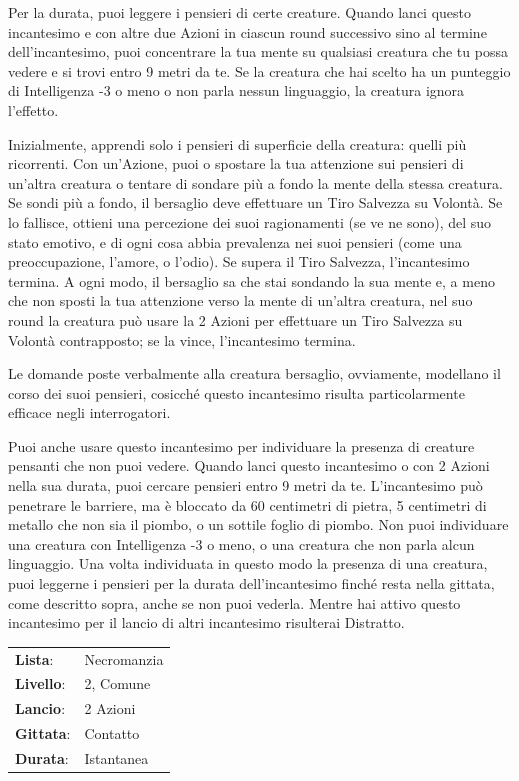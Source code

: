 \begin{multicols}{2}
Per la durata, puoi leggere i pensieri di certe creature. Quando lanci questo incantesimo e con altre due Azioni in ciascun round successivo sino al termine dell'incantesimo, puoi concentrare la tua mente su qualsiasi creatura che tu possa vedere e si trovi entro 9 metri da te. Se la creatura che hai scelto ha un punteggio di Intelligenza -3 o meno o non parla nessun linguaggio, la creatura ignora l'effetto.

Inizialmente, apprendi solo i pensieri di superficie della creatura: quelli più ricorrenti. Con un'Azione, puoi o spostare la tua attenzione sui pensieri di un'altra creatura o tentare di sondare più a fondo la mente della stessa creatura. Se sondi più a fondo, il bersaglio deve effettuare un Tiro Salvezza su Volontà. Se lo fallisce, ottieni una percezione dei suoi ragionamenti (se ve ne sono), del suo stato emotivo, e di ogni cosa abbia prevalenza nei suoi pensieri (come una preoccupazione, l'amore, o l'odio). Se supera il Tiro Salvezza, l'incantesimo termina. A ogni modo, il bersaglio sa che stai sondando la sua mente e, a meno che non sposti la tua attenzione verso la mente di un'altra creatura, nel suo round la creatura può usare la 2 Azioni per effettuare un Tiro Salvezza su Volontà contrapposto; se la vince, l'incantesimo termina.

Le domande poste verbalmente alla creatura bersaglio, ovviamente, modellano il corso dei suoi pensieri, cosicché questo incantesimo risulta particolarmente efficace negli interrogatori.

Puoi anche usare questo incantesimo per individuare la presenza di creature pensanti che non puoi vedere. Quando lanci questo incantesimo o con 2 Azioni nella sua durata, puoi cercare pensieri entro 9 metri da te. L'incantesimo può penetrare le barriere, ma è bloccato da 60 centimetri di pietra, 5 centimetri di metallo che non sia il piombo, o un sottile foglio di piombo. Non puoi individuare una creatura con Intelligenza -3 o meno, o una creatura che non parla alcun linguaggio. Una volta individuata in questo modo la presenza di una creatura, puoi leggerne i pensieri per la durata dell'incantesimo finché resta nella gittata, come descritto sopra, anche se non puoi vederla.
Mentre hai attivo questo incantesimo per il lancio di altri incantesimo risulterai Distratto.

\noindent\begin{tabularx}{\linewidth}{p{1.3cm}X}
	\rowcolor{gray!20}\textbf{Lista}: & Necromanzia \\
	\textbf{Livello}: & 2, Comune \\
	\rowcolor{gray!20}\textbf{Lancio}: & 2 Azioni \\
	\textbf{Gittata}: & Contatto \\
	\rowcolor{gray!20}\textbf{Durata}: & Istantanea \\
\end{tabularx}\smallskip


\end{multicols}
